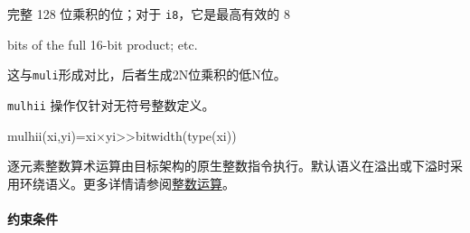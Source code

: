 \documentclass{article}
\begin{document}
完整 128 位乘积的位；对于 \texttt{i8}，它是最高有效的 8

bits of the full 16-bit product; etc.




这与\texttt{muli}形成对比，后者生成2N位乘积的低N位。



\texttt{mulhii} 操作仅针对无符号整数定义。



mulhii(xi,yi)=xi×yi>>bitwidth(type(xi))


逐元素整数算术运算由目标架构的原生整数指令执行。默认语义在溢出或下溢时采用环绕语义。更多详情请参阅\href{https://docs.nvidia.com/cuda/tile-ir/latest/sections/operations.html#op-group-integer}{整数运算}。





\paragraph{约束条件}
\end{document}
